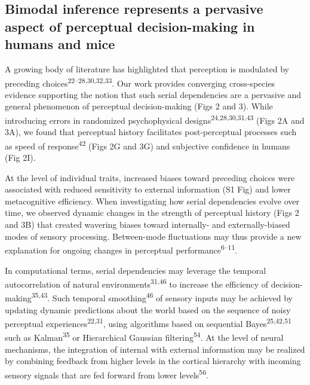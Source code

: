 \documentclass[
]{article}
\begin{document}
\hypertarget{bimodal-inference-represents-a-pervasive-aspect-of-perceptual-decision-making-in-humans-and-mice}{%
\subsection{Bimodal inference represents a pervasive aspect of
perceptual decision-making in humans and
mice}\label{bimodal-inference-represents-a-pervasive-aspect-of-perceptual-decision-making-in-humans-and-mice}}

A growing body of literature has highlighted that perception is
modulated by preceding choices\textsuperscript{22--28,30,32,33}. Our
work provides converging cross-species evidence supporting the notion
that such serial dependencies are a pervasive and general phenomenon of
perceptual decision-making (Figs 2 and 3). While introducing errors
in randomized psychophysical designs\textsuperscript{24,28,30,31,43}
(Figs 2A and 3A), we found that perceptual history facilitates
post-perceptual processes such as speed of response\textsuperscript{42}
(Figs 2G and 3G) and subjective confidence in humans (Fig 2I).

At the level of individual traits, increased biases toward preceding
choices were associated with reduced sensitivity to external information
(S1 Fig) and lower metacognitive efficiency. When
investigating how serial dependencies evolve over time, we observed
dynamic changes in the strength of perceptual history (Figs 2 and 3B)
that created wavering biases toward internally- and externally-biased
modes of sensory processing. Between-mode fluctuations may thus provide
a new explanation for ongoing changes in perceptual
performance\textsuperscript{6--11}.

In computational terms, serial dependencies may leverage the temporal
autocorrelation of natural environments\textsuperscript{31,46} to
increase the efficiency of decision-making\textsuperscript{35,43}. Such
temporal smoothing\textsuperscript{46} of sensory inputs may be achieved
by updating dynamic predictions about the world based on the sequence of
noisy perceptual experiences\textsuperscript{22,31}, using algorithms
based on sequential Bayes\textsuperscript{25,42,51} such as
Kalman\textsuperscript{35} or Hierarchical Gaussian
filtering\textsuperscript{54}. At the level of neural mechanisms, the
integration of internal with external information may be realized by
combining feedback from higher levels in the cortical hierarchy with
incoming sensory signals that are fed forward from lower
levels\textsuperscript{56}.
\end{document}
